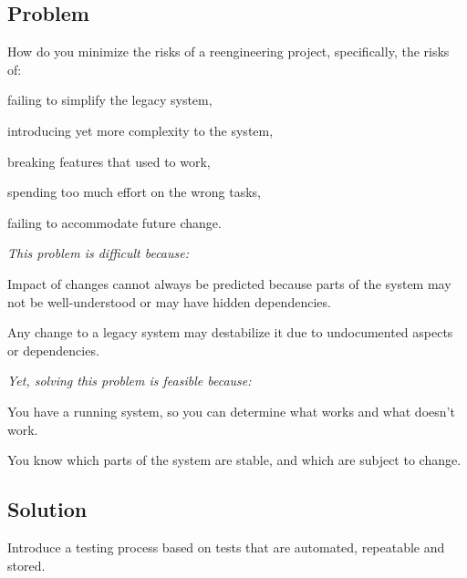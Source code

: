 \documentclass[a4paper,10pt,twoside]{book}
\begin{document}



\subsection*{Problem}

How do you minimize the risks of a reengineering project, specifically, the risks of:

\begin{bulletlist}
\item failing to simplify the legacy system, 
\item introducing yet more complexity to the system,
\item breaking features that used to work,
\item spending too much effort on the wrong tasks, 
\item failing to accommodate future change.
\end{bulletlist}

\emph{This problem is difficult because:}

\begin{bulletlist}
\item Impact of changes cannot always be predicted because parts of the system may not be well-understood or may have hidden dependencies. 
\item Any change to a legacy system may destabilize it due to undocumented aspects or dependencies.
\end{bulletlist}

\emph{Yet, solving this problem is feasible because:}

\begin{bulletlist}
\item You have a running system, so you can determine what works and what doesn't work.
\item You know which parts of the system are stable, and which are subject to change.
\end{bulletlist}

\subsection*{Solution}

Introduce a testing process based on tests that are automated, repeatable and stored.
\end{document}
